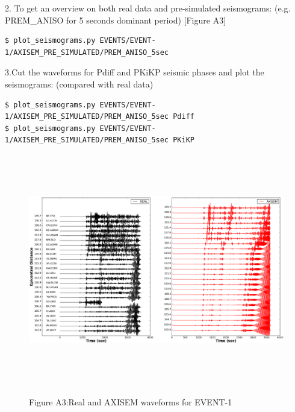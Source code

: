 \documentclass{article}
\begin{document}
\baselineskip=13pt
\leftskip=0pt
2. To get an overview on both real data and pre-simulated seismograms: (e.g. PREM\_ANISO 
for 5 seconds dominant period) [Figure A3]
\begin{lstlisting}
$ plot_seismograms.py EVENTS/EVENT-1/AXISEM_PRE_SIMULATED/PREM_ANISO_5sec
\end{lstlisting}

3.Cut the waveforms for Pdiff and PKiKP seismic phases and plot the seismograms: 
(compared with real data)
\begin{lstlisting}
$ plot_seismograms.py EVENTS/EVENT-1/AXISEM_PRE_SIMULATED/PREM_ANISO_5sec Pdiff
$ plot_seismograms.py EVENTS/EVENT-1/AXISEM_PRE_SIMULATED/PREM_ANISO_5sec PKiKP
\end{lstlisting}

\begin{figure}
\includegraphics[width=497pt, height=287pt, keepaspectratio=true]{AXISEMTutorial-fig007.png}
\begin{center}
{\small{}Figure A3:Real and AXISEM waveforms for EVENT-1}
\end{center}
\end{figure}
\end{document}
